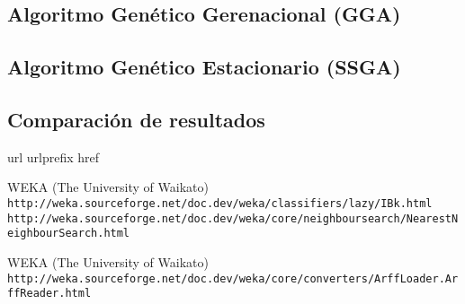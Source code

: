 \documentclass[a4paper, 11pt]{article}
\begin{document}
		\subsection{Algoritmo Genético Gerenacional (\textbf{GGA})}
			
			
			
		\subsection{Algoritmo Genético Estacionario (\textbf{SSGA})}
			
			
			
			
		\subsection{Comparación de resultados}
			
			
	
	\newpage
	
	\begin{thebibliography}{10}
	\expandafter\ifx\csname url\endcsname\relax
	  \def\url#1{\texttt{#1}}\fi
	\expandafter\ifx\csname urlprefix\endcsname\relax\def\urlprefix{URL }\fi
	\expandafter\ifx\csname href\endcsname\relax
	  \def\href#1#2{#2} \def\path#1{#1}\fi
	
	WEKA (The University of Waikato)\\
	  \url{http://weka.sourceforge.net/doc.dev/weka/classifiers/lazy/IBk.html}\\
	  \url{http://weka.sourceforge.net/doc.dev/weka/core/neighboursearch/NearestNeighbourSearch.html}
	  
  	WEKA (The University of Waikato)\\
	  \url{http://weka.sourceforge.net/doc.dev/weka/core/converters/ArffLoader.ArffReader.html}
	  
	\end{thebibliography}
\end{document}
